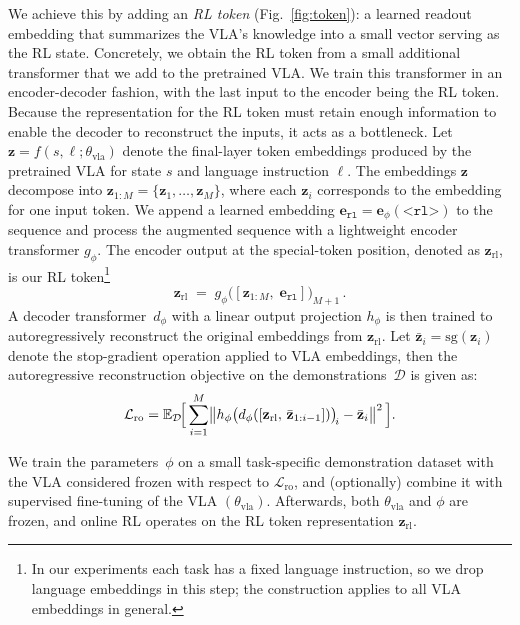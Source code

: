We achieve this by adding an \emph{RL token} (Fig.~\ref{fig:token}): a learned readout embedding that summarizes the VLA's knowledge into a small vector serving as the RL state.
Concretely, we obtain the RL token from a small additional transformer that we add to the pretrained VLA. We train this transformer in an encoder-decoder \citep{sutskever2014sequence} fashion, with the last input to the encoder being the RL token. Because the representation for the RL token must retain enough information to enable the decoder to reconstruct the inputs, it acts as a bottleneck.
Let $\mathbf{z} = f(s,\ell;\theta_{\text{vla}})$ denote the final-layer token embeddings produced by the pretrained VLA for state $s$ and language instruction $\ell$. The embeddings $\mathbf{z}$ decompose into $\mathbf{z}_{1:M} = \{\mathbf{z}_1,\dots,\mathbf{z}_M\}$, where each $\mathbf{z}_i$ corresponds to the embedding for one input token. 
We append a learned embedding $\mathbf{e}_\texttt{rl} = \mathbf{e}_\phi(\texttt{<rl>})$ to the sequence and process the augmented sequence with a lightweight encoder transformer $g_\phi$. The encoder output at the special-token position, denoted as $\mathbf{z}_{\text{rl}}$, is our RL token\footnote{In our experiments each task has a fixed language instruction, so we drop language embeddings in this step; the construction applies to all VLA embeddings in general.}
\begin{equation}
  \mathbf{z}_{\text{rl}} \;=\; g_\phi\!\bigl([\mathbf{z}_{1:M},\;\mathbf{e}_\texttt{rl}]\bigr)_{M+1}\,.
  \label{eq:readout}
\end{equation}
A decoder transformer~$d_\phi$ with a linear output projection $h_\phi$ is then trained to autoregressively reconstruct the original embeddings from $\mathbf{z}_{\text{rl}}$. Let $\bar{\mathbf{z}}_i = \mathrm{sg}(\mathbf{z}_i)$ denote the stop-gradient operation applied to VLA embeddings, then the autoregressive reconstruction objective on the demonstrations~$\mathcal{D}$ is given as:
\begin{equation}
  \mathcal{L}_{\text{ro}} = \mathbb{E}_{\mathcal{D}}\!\Bigl[\,
    \sum_{i=1}^{M}
      \bigl\lVert h_\phi\bigl(d_\phi([\mathbf{z}_{\text{rl}},\,\bar{\mathbf{z}}_{1:i-1}])\bigr)_{\!i}
        - \bar{\mathbf{z}}_i \bigr\rVert^2
  \,\Bigr].
  \label{eq:recon}
\end{equation}

We train the parameters~$\phi$ on a small task-specific demonstration dataset with the VLA considered frozen with respect to $\mathcal{L}_{\text{ro}}$, and (optionally) combine it with supervised fine-tuning of the VLA $(\theta_{\text{vla}})$. Afterwards, both $\theta_{\text{vla}}$ and $\phi$ are frozen, and online RL operates on the RL token representation $\mathbf{z}_{\text{rl}}$.

